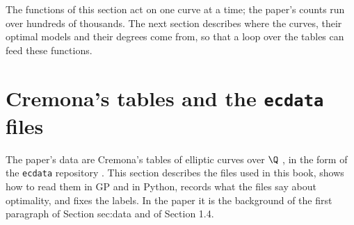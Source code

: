 \begin{sloppypar}
The functions of this section act on one curve at a time; the paper's counts run over hundreds of thousands. The next section describes where
the curves, their optimal models and their degrees come from, so that a loop over the tables can feed these functions.
\section{Cremona's tables and the \texttt{ecdata} files}\label{sec:computation:ecdata}

The paper's data are Cremona's tables of elliptic curves over $\Q$ \cite{Cremona97}, in the form of the \texttt{ecdata} repository
\cite{ecdata}. This section describes the files used in this book, shows how to read them in GP and in Python, records what the files say
about optimality, and fixes the labels. In the paper it is the background of the first paragraph of Section sec:data and of Section 1.4.


\end{sloppypar}
